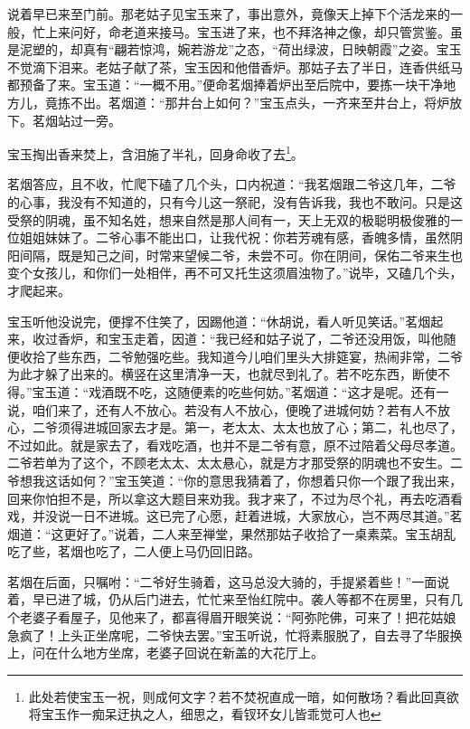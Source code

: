 \documentclass[12pt,oneside]{book}
\begin{document}
说着早已来至门前。那老姑子见宝玉来了，事出意外，竟像天上掉下个活龙来的一般，忙上来问好，命老道来接马。宝玉进了来，也不拜洛神之像，却只管赏鉴。虽是泥塑的，却真有“翩若惊鸿，婉若游龙”之态，“荷出绿波，日映朝霞”之姿。宝玉不觉滴下泪来。老姑子献了茶，宝玉因和他借香炉。那姑子去了半日，连香供纸马都预备了来。宝玉道：“一概不用。”便命茗烟捧着炉出至后院中，要拣一块干净地方儿，竟拣不出。茗烟道：“那井台上如何？”宝玉点头，一齐来至井台上，将炉放下。茗烟站过一旁。

宝玉掏出香来焚上，含泪施了半礼，回身命收了去\footnote{此处若使宝玉一祝，则成何文字？若不焚祝直成一暗，如何散场？看此回真欲将宝玉作一痴呆迂执之人，细思之，看钗环女儿皆乖觉可人也}。

茗烟答应，且不收，忙爬下磕了几个头，口内祝道：“我茗烟跟二爷这几年，二爷的心事，我没有不知道的，只有今儿这一祭祀，没有告诉我，我也不敢问。只是这受祭的阴魂，虽不知名姓，想来自然是那人间有一，天上无双的极聪明极俊雅的一位姐姐妹妹了。二爷心事不能出口，让我代祝：你若芳魂有感，香魄多情，虽然阴阳间隔，既是知己之间，时常来望候二爷，未尝不可。你在阴间，保佑二爷来生也变个女孩儿，和你们一处相伴，再不可又托生这须眉浊物了。”说毕，又磕几个头，才爬起来。

宝玉听他没说完，便撑不住笑了，因踢他道：“休胡说，看人听见笑话。”茗烟起来，收过香炉，和宝玉走着，因道：“我已经和姑子说了，二爷还没用饭，叫他随便收拾了些东西，二爷勉强吃些。我知道今儿咱们里头大排筵宴，热闹非常，二爷为此才躲了出来的。横竖在这里清净一天，也就尽到礼了。若不吃东西，断使不得。”宝玉道：“戏酒既不吃，这随便素的吃些何妨。”茗烟道：“这才是呢。还有一说，咱们来了，还有人不放心。若没有人不放心，便晚了进城何妨？若有人不放心，二爷须得进城回家去才是。第一，老太太、太太也放了心；第二，礼也尽了，不过如此。就是家去了，看戏吃酒，也并不是二爷有意，原不过陪着父母尽孝道。二爷若单为了这个，不顾老太太、太太悬心，就是方才那受祭的阴魂也不安生。二爷想我这话如何？”宝玉笑道：“你的意思我猜着了，你想着只你一个跟了我出来，回来你怕担不是，所以拿这大题目来劝我。我才来了，不过为尽个礼，再去吃酒看戏，并没说一日不进城。这已完了心愿，赶着进城，大家放心，岂不两尽其道。”茗烟道：“这更好了。”说着，二人来至禅堂，果然那姑子收拾了一桌素菜。宝玉胡乱吃了些，茗烟也吃了，二人便上马仍回旧路。

茗烟在后面，只嘱咐：“二爷好生骑着，这马总没大骑的，手提紧着些！”一面说着，早已进了城，仍从后门进去，忙忙来至怡红院中。袭人等都不在房里，只有几个老婆子看屋子，见他来了，都喜得眉开眼笑说：“阿弥陀佛，可来了！把花姑娘急疯了！上头正坐席呢，二爷快去罢。”宝玉听说，忙将素服脱了，自去寻了华服换上，问在什么地方坐席，老婆子回说在新盖的大花厅上。
\end{document}

